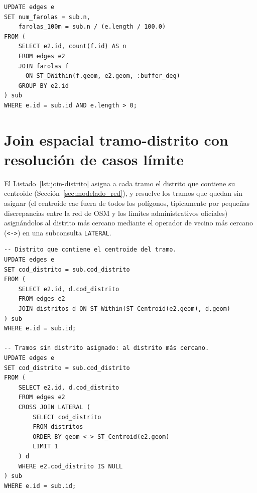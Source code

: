 \begin{lstlisting}[style=SQL, caption={Densidad de farolas por tramo (\texttt{scripts/03\_load\_farolas.py}).}, label={lst:buffer-farolas}]
UPDATE edges e
SET num_farolas = sub.n,
    farolas_100m = sub.n / (e.length / 100.0)
FROM (
    SELECT e2.id, count(f.id) AS n
    FROM edges e2
    JOIN farolas f
      ON ST_DWithin(f.geom, e2.geom, :buffer_deg)
    GROUP BY e2.id
) sub
WHERE e.id = sub.id AND e.length > 0;
\end{lstlisting}

\section{Join espacial tramo-distrito con resolución de casos límite}
\label{ap:sec:join_distrito}

El Listado~\ref{lst:join-distrito} asigna a cada tramo el distrito que contiene su centroide (Sección~\ref{sec:modelado_red}), y resuelve los tramos que quedan sin asignar (el centroide cae fuera de todos los polígonos, típicamente por pequeñas discrepancias entre la red de OSM y los límites administrativos oficiales) asignándolos al distrito más cercano mediante el operador de vecino más cercano (\texttt{<->}) en una subconsulta \texttt{LATERAL}.

\begin{lstlisting}[style=SQL, caption={Join espacial tramo-distrito (\texttt{scripts/06\_load\_distritos.py}).}, label={lst:join-distrito}]
-- Distrito que contiene el centroide del tramo.
UPDATE edges e
SET cod_distrito = sub.cod_distrito
FROM (
    SELECT e2.id, d.cod_distrito
    FROM edges e2
    JOIN distritos d ON ST_Within(ST_Centroid(e2.geom), d.geom)
) sub
WHERE e.id = sub.id;

-- Tramos sin distrito asignado: al distrito más cercano.
UPDATE edges e
SET cod_distrito = sub.cod_distrito
FROM (
    SELECT e2.id, d.cod_distrito
    FROM edges e2
    CROSS JOIN LATERAL (
        SELECT cod_distrito
        FROM distritos
        ORDER BY geom <-> ST_Centroid(e2.geom)
        LIMIT 1
    ) d
    WHERE e2.cod_distrito IS NULL
) sub
WHERE e.id = sub.id;
\end{lstlisting}
